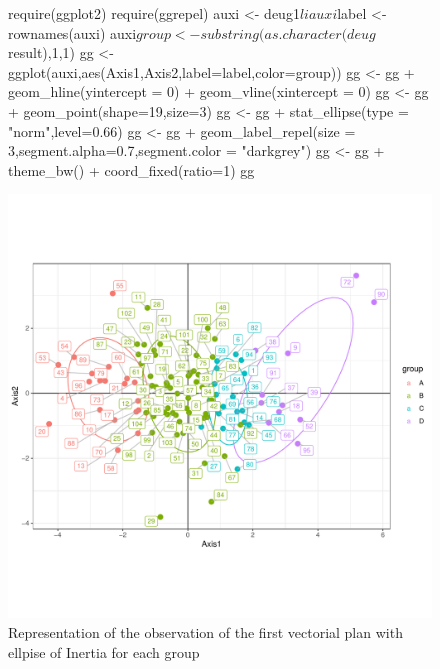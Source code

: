 \documentclass[a4paper,10pt]{article}
\begin{document}
\begin{figure}[H]
\begin{center}
\begin{Schunk}
\begin{Sinput}
  require(ggplot2)
  require(ggrepel)
  auxi <- deug1$li
  auxi$label <- rownames(auxi)
  auxi$group <- substring(as.character(deug$result),1,1)
  gg <- ggplot(auxi,aes(Axis1,Axis2,label=label,color=group))
  gg <- gg + geom_hline(yintercept = 0) + geom_vline(xintercept = 0)
  gg <- gg + geom_point(shape=19,size=3)
  gg <- gg + stat_ellipse(type = "norm",level=0.66)
  gg <- gg + geom_label_repel(size = 3,segment.alpha=0.7,segment.color = "darkgrey")
  gg <-  gg + theme_bw() + coord_fixed(ratio=1)
  gg
\end{Sinput}
\end{Schunk}
\includegraphics{figs/sweave-liclass3}
\caption{Representation of the observation of the first vectorial plan with ellpise of Inertia for each group}
\label{fig:liclass3}
\end{center}
\end{figure}
\end{document}
